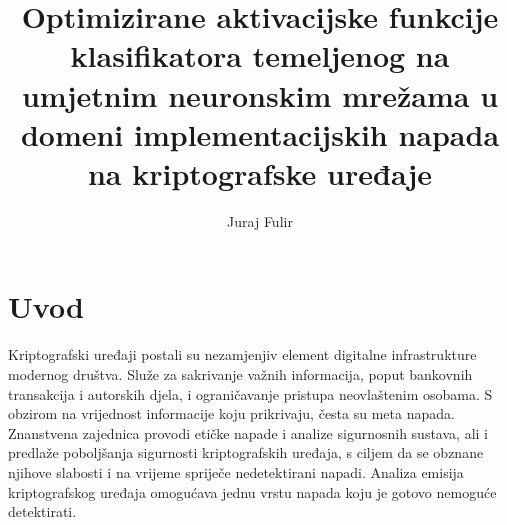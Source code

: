 \documentclass[times, utf8, numeric, diplomski]{fer}
\begin{document}

\title{Optimizirane aktivacijske funkcije klasifikatora temeljenog na umjetnim neuronskim mrežama u domeni implementacijskih napada na kriptografske uređaje}

\author{Juraj Fulir}

\maketitle

\izvornik


\tableofcontents

\chapter{Uvod}
Kriptografski uređaji postali su nezamjenjiv element digitalne infrastrukture modernog društva. Služe za sakrivanje važnih informacija, poput bankovnih transakcija i autorskih djela, i ograničavanje pristupa neovlaštenim osobama. S obzirom na vrijednost informacije koju prikrivaju, česta su meta napada. Znanstvena zajednica provodi etičke napade i analize sigurnosnih sustava, ali i predlaže poboljšanja sigurnosti kriptografskih uređaja, s ciljem da se obznane njihove slabosti i na vrijeme spriječe nedetektirani napadi. Analiza emisija kriptografskog uređaja omogućava jednu vrstu napada koju je gotovo nemoguće detektirati.
\end{document}

